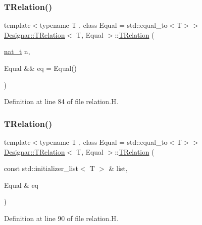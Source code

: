 \subsubsection{\texorpdfstring{T\+Relation()}{TRelation()}\hspace{0.1cm}{\footnotesize\ttfamily [2/4]}}
{\footnotesize\ttfamily template$<$typename T , class Equal  = std\+::equal\+\_\+to$<$\+T$>$$>$ \\
\hyperlink{class_designar_1_1_t_relation}{Designar\+::\+T\+Relation}$<$ T, Equal $>$\+::\hyperlink{class_designar_1_1_t_relation}{T\+Relation} (\begin{DoxyParamCaption}\item[{\hyperlink{namespace_designar_aa72662848b9f4815e7bf31a7cf3e33d1}{nat\+\_\+t}}]{n,  }\item[{Equal \&\&}]{eq = {\ttfamily Equal()} }\end{DoxyParamCaption})\hspace{0.3cm}{\ttfamily [inline]}}



Definition at line 84 of file relation.\+H.

\mbox{\label{class_designar_1_1_t_relation_a176c516d96ff9476d54b0e76497d224b}} 
\subsubsection{\texorpdfstring{T\+Relation()}{TRelation()}\hspace{0.1cm}{\footnotesize\ttfamily [3/4]}}
{\footnotesize\ttfamily template$<$typename T , class Equal  = std\+::equal\+\_\+to$<$\+T$>$$>$ \\
\hyperlink{class_designar_1_1_t_relation}{Designar\+::\+T\+Relation}$<$ T, Equal $>$\+::\hyperlink{class_designar_1_1_t_relation}{T\+Relation} (\begin{DoxyParamCaption}\item[{const std\+::initializer\+\_\+list$<$ T $>$ \&}]{list,  }\item[{Equal \&}]{eq }\end{DoxyParamCaption})\hspace{0.3cm}{\ttfamily [inline]}}



Definition at line 90 of file relation.\+H.


